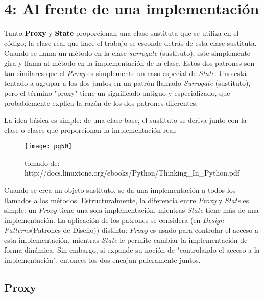 \section*{4: Al frente de una implementación}
\label{sec:afdui}

Tanto \textbf{Proxy} y \textbf{State} proporcionan una clase sustituta que se utiliza en el código; la clase real que hace el trabajo se esconde detrás de esta clase sustituta. Cuando se llama un método en la clase \textit{surrogate} (sustituto), este simplemente gira y llama al método en la implementación de la clase. Estos dos patrones son tan similares que el \textit{Proxy} es simplemente un caso especial de \textit{State}. Uno está tentado a agrupar a los dos juntos en un patrón llamado \textit{Surrogate} (sustituto), pero el término "proxy" tiene un significado antiguo y  especializado, que probablemente explica la razón de los dos patrones diferentes.    \newline

La idea básica es simple: de una clase base, el sustituto se deriva junto con la clase o clases que proporcionan la implementación real:

\begin{figure}[h]
    \centering
    \texttt{[image: pg50]} 
    \caption{tomado de: http://docs.linuxtone.org/ebooks/Python/Thinking\_In\_Python.pdf }
    \label{fig:mesh1}
\end{figure}

Cuando se crea un objeto sustituto, se da una implementación a todos los llamados a los métodos.    \newline
Estructuralmente, la diferencia entre \textit{Proxy} y \textit{State} es simple: un \textit{Proxy} tiene una sola implementación, mientras \textit{State} tiene más de una implementación. La aplicación  de los patrones se considera (en \textit{Design Patterns}(Patrones de Diseño)) distinta: \textit{Proxy} es usado para controlar el acceso a esta implementación, mientras \textit{State}  le permite cambiar la implementación de forma dinámica. Sin embargo, si expande su noción de "controlando el acceso a la implementación", entonces los dos encajan pulcramente juntos.

\subsection*{Proxy}
\label{subsec:Proxy}


